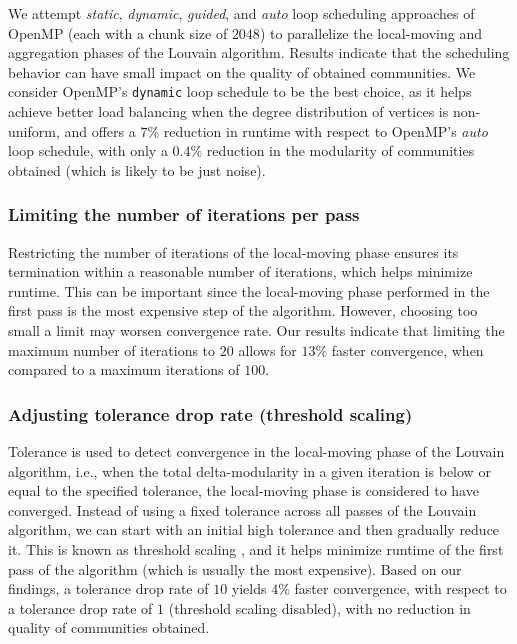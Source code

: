 We attempt \textit{static}, \textit{dynamic}, \textit{guided}, and \textit{auto} loop scheduling approaches of OpenMP (each with a chunk size of $2048$) to parallelize the local-moving and aggregation phases of the Louvain algorithm. Results indicate that the scheduling behavior can have small impact on the quality of obtained communities. We consider OpenMP's \verb|dynamic| loop schedule to be the best choice, as it helps achieve better load balancing when the degree distribution of vertices is non-uniform, and offers a $7\%$ reduction in runtime with respect to OpenMP's \textit{auto} loop schedule, with only a $0.4\%$ reduction in the modularity of communities obtained (which is likely to be just noise).

\subsubsection{Limiting the number of iterations per pass}

Restricting the number of iterations of the local-moving phase ensures its termination within a reasonable number of iterations, which helps minimize runtime. This can be important since the local-moving phase performed in the first pass is the most expensive step of the algorithm. However, choosing too small a limit may worsen convergence rate. Our results indicate that limiting the maximum number of iterations to $20$ allows for $13\%$ faster convergence, when compared to a maximum iterations of $100$.


\subsubsection{Adjusting tolerance drop rate (threshold scaling)}

Tolerance is used to detect convergence in the local-moving phase of the Louvain algorithm, i.e., when the total delta-modularity in a given iteration is below or equal to the specified tolerance, the local-moving phase is considered to have converged. Instead of using a fixed tolerance across all passes of the Louvain algorithm, we can start with an initial high tolerance and then gradually reduce it. This is known as threshold scaling \cite{com-lu15, com-naim17, com-halappanavar17}, and it helps minimize runtime of the first pass of the algorithm (which is usually the most expensive). Based on our findings, a tolerance drop rate of $10$ yields $4\%$ faster convergence, with respect to a tolerance drop rate of $1$ (threshold scaling disabled), with no reduction in quality of communities obtained.


